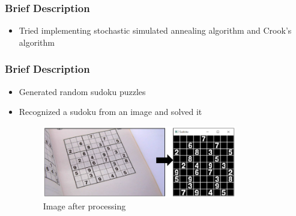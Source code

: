 \documentclass{beamer}
\begin{document}
\begin{frame}
     \frametitle{Brief Description}   
     \begin{itemize}
          \item Tried implementing stochastic simulated annealing algorithm and Crook's algorithm
               \begin{figure}%
                    \centering
                    \qquad
                    \label{fig:example}%
                \end{figure}
	 \end{itemize}
\end{frame}

\begin{frame}
     \frametitle{Brief Description}   
     \begin{itemize}
		  \item Generated random sudoku puzzles
		  \item Recognized a sudoku from an image and solved it
		  \begin{figure}
               \includegraphics[width=0.8\textwidth]{./week9_img/transformation.png}
               \caption{Image after processing}
               \end{figure}
	 \end{itemize}
\end{frame}
\end{document}
